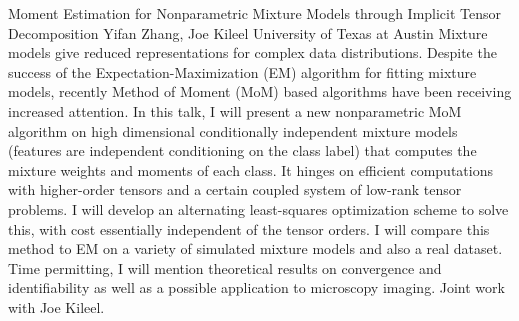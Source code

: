\begin{addmargin}[2em]{0em}
\vspace{1.5ex}
\abs
{Moment Estimation for Nonparametric Mixture Models through Implicit Tensor Decomposition}
{Yifan Zhang, Joe Kileel}
{University of Texas at Austin}
{Mixture models give reduced representations for complex data distributions. Despite the success of the Expectation-Maximization (EM) algorithm for fitting mixture models, recently Method of Moment (MoM) based algorithms have been receiving increased attention. In this talk, I will present a new nonparametric MoM algorithm on high dimensional conditionally independent mixture models (features are independent conditioning on the class label) that computes the mixture weights and moments of each class. It hinges on efficient computations with higher-order tensors and a certain coupled system of low-rank tensor problems. I will develop an alternating least-squares optimization scheme to solve this, with cost essentially independent of the tensor orders. I will compare this method to EM on a variety of simulated mixture models and also a real dataset. Time permitting, I will mention theoretical results on convergence and identifiability as well as a possible application to microscopy imaging. Joint work with Joe Kileel.}



\end{addmargin}
